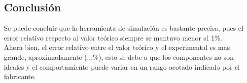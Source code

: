 \subsection{Conclusión}
Se puede concluir que la herramienta de simulación es bastante precisa, pues el error relativo respecto al valor teórico siempre se mantuvo menor al 1\%.\\
Ahora bien, el error relativo entre el valor teórico y el experimental es mas grande, aproximadamente (...\%), esto se debe a que los componentes no son ideales y el comportamiento puede variar en un rango acotado indicado por el fabricante.  
